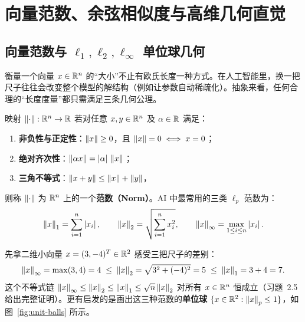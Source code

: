 \section{向量范数、余弦相似度与高维几何直觉}\label{sec:norms-highdim}

\subsection{向量范数与 $\ell_1, \ell_2, \ell_\infty$ 单位球几何}

衡量一个向量 $x \in \mathbb{R}^n$ 的“大小”不止有欧氏长度一种方式。在人工智能里，换一把尺子往往会改变整个模型的解结构（例如让参数自动稀疏化）。抽象来看，任何合理的“长度度量”都只需满足三条几何公理。

\begin{defBox}
\begin{definition}\label{def:vector-norm}
映射 $\left\|\cdot\right\|: \mathbb{R}^n \to \mathbb{R}$ 若对任意 $x, y \in \mathbb{R}^n$ 及 $\alpha \in \mathbb{R}$ 满足：
\begin{enumerate}
  \item \textbf{非负性与正定性}：$\left\|x\right\| \ge 0$，且 $\left\|x\right\| = 0 \iff x = 0$；
  \item \textbf{绝对齐次性}：$\left\|\alpha x\right\| = \left|\alpha\right|\,\left\|x\right\|$；
  \item \textbf{三角不等式}：$\left\|x + y\right\| \le \left\|x\right\| + \left\|y\right\|$，
\end{enumerate}
则称 $\left\|\cdot\right\|$ 为 $\mathbb{R}^n$ 上的一个\textbf{范数（Norm）}。AI 中最常用的三类 $\ell_p$ 范数为：
\[
\left\|x\right\|_1 = \sum_{i=1}^{n} \left|x_i\right|, \qquad
\left\|x\right\|_2 = \sqrt{\sum_{i=1}^{n} x_i^2}, \qquad
\left\|x\right\|_\infty = \max_{1 \le i \le n} \left|x_i\right|.
\]
\end{definition}
\end{defBox}

先拿二维小向量 $x = (3, -4)^T \in \mathbb{R}^2$ 感受三把尺子的差别：
\[
\left\|x\right\|_\infty = \max(3, 4) = 4
\;\le\;
\left\|x\right\|_2 = \sqrt{3^2 + (-4)^2} = 5
\;\le\;
\left\|x\right\|_1 = 3 + 4 = 7.
\]
这个不等式链 $\left\|x\right\|_\infty \le \left\|x\right\|_2 \le \left\|x\right\|_1 \le \sqrt{n}\left\|x\right\|_2$ 对所有 $x \in \mathbb{R}^n$ 恒成立（习题~2.5 给出完整证明）。更有启发的是画出这三种范数的\textbf{单位球} $\{x \in \mathbb{R}^2 : \left\|x\right\|_p \le 1\}$，如图~\ref{fig:unit-balls} 所示。

